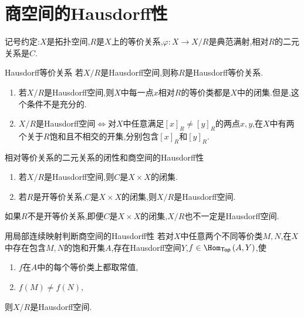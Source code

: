 \section{商空间的Hausdorff性}

记号约定:$X$是拓扑空间,$R$是$X$上的等价关系,$\varphi:X\to X/R$是典范满射,相对$R$的二元关系是$C$.

\begin{definition}{Hausdorff等价关系}{}
	若$X/R$是Hausdorff空间,则称$R$是Hausdorff等价关系.
\end{definition}

\begin{remark}{}{}
	\begin{enumerate}
		\item 若$X/R$是Hausdorff空间,则$X$中每一点$x$相对$R$的等价类都是$X$中的闭集.但是,这个条件不是充分的.
		\item $X/R$是Hausdorff空间$\iff$对$X$中任意满足$\left[x\right]_{R}\neq\left[y\right]_{R}$的两点$x,y$,在$X$中有两个关于$R$饱和且不相交的开集,分别包含$\left[x\right]_{R}$和$\left[y\right]_{R}$.
	\end{enumerate}
\end{remark}

\begin{proposition}{相对等价关系的二元关系的闭性和商空间的Hausdorff性}{}
	\begin{enumerate}
		\item 若$X/R$是Hausdorff空间,则$C$是$X\times X$的闭集.
		\item 若$R$是开等价关系,$C$是$X\times X$的闭集,则$X/R$是Hausdorff空间.
	\end{enumerate}
\end{proposition}

\begin{remark}{}{}
	如果$R$不是开等价关系,即便$C$是$X\times X$的闭集,$X/R$也不一定是Hausdorff空间.
\end{remark}

\begin{proposition}{用局部连续映射判断商空间的Hausdorff性}{}
	若对$X$中任意两个不同等价类$M,N$,在$X$中存在包含$M,N$的饱和开集$A$,存在Hausdorff空间$Y$,$f\in\Hom_{\mathsf{Top}}\left(A,Y\right)$,使
	\begin{enumerate}
		\item $f$在$A$中的每个等价类上都取常值,
		\item $f\left(M\right)\neq f\left(N\right)$,
	\end{enumerate}
	则$X/R$是Hausdorff空间.
\end{proposition}

